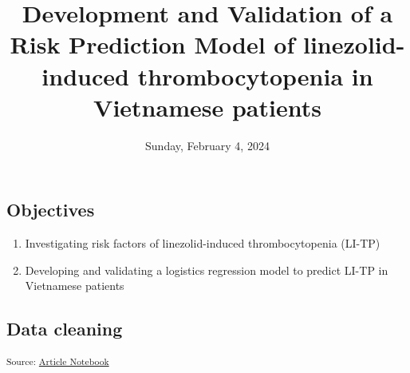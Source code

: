 \documentclass[
  letterpaper,
  DIV=11,
  numbers=noendperiod]{scrartcl}
\title{Development and Validation of a Risk Prediction Model of
linezolid-induced thrombocytopenia in Vietnamese patients}
\author{}
\date{Sunday, February 4, 2024}
\providecommand{\tightlist}{%
  \setlength{\itemsep}{0pt}\setlength{\parskip}{0pt}}\usepackage{longtable,booktabs,array}
\begin{document}
\maketitle

\subsection{Objectives}\label{objectives}

\begin{enumerate}
\def\labelenumi{\arabic{enumi}.}
\tightlist
\item
  Investigating risk factors of linezolid-induced thrombocytopenia
  (LI-TP)
\item
  Developing and validating a logistics regression model to predict
  LI-TP in Vietnamese patients
\end{enumerate}

\subsection{Data cleaning}\label{data-cleaning}

\textsubscript{Source:
\href{https://AnTangQuoc.github.io/LZD-TP-pred-model/index.qmd.html}{Article
Notebook}}
\end{document}
